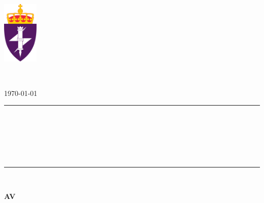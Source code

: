 \thispagestyle{empty}
\begin{minipage}{0.15\textwidth}
    \includegraphics[height=3cm]{Media/cisk.png}
\end{minipage}%
\begin{minipage}{0.4\textwidth}
    \vspace{10ex}
    \raggedright
    {\bfseries\itshape\institution}\\
    {\bfseries\itshape\laboratory}
\end{minipage}%
\begin{minipage}{0.4\textwidth}
    \vspace{13ex}
    \raggedleft
    {\today}
\end{minipage}
\vspace{1ex}

{\noindent\rule{\textwidth}{2pt}} \\ \vspace{3ex}
\begin{center}
    {\fontsize{32}{36}\selectfont \bfseries \assignmenttype}\\[6ex]
    {\fontsize{22}{26}\selectfont \bfseries \assignmenttitle}\\[10ex]
    {\fontsize{16}{20}\selectfont \bfseries \coursecode}\\[3ex]

    {\noindent\rule{\textwidth}{2pt}} \\\vspace{3ex}

    {\fontsize{20}{24}\selectfont \bfseries AV}\\[3ex]
    {\fontsize{20}{24}\selectfont \bfseries \studentname}\\
    \vspace{0.1cm}
    {\fontsize{20}{24}\selectfont \bfseries \partnername}\\
    \vspace{0.2cm}
    {\fontsize{20}{24}\selectfont \bfseries \memberthree}\\
    \vspace{0.2cm}
    {\fontsize{20}{24}\selectfont \bfseries \memberfour}\\ [5ex]
\end{center}

